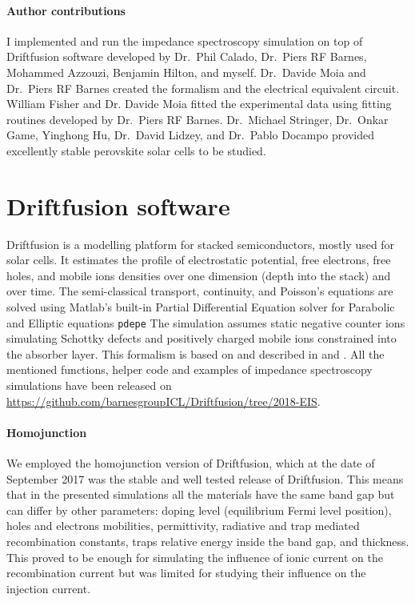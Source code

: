 	\paragraph{Author contributions}
	I implemented and run the impedance spectroscopy simulation on top of Driftfusion software developed by Dr.\ Phil Calado, Dr.\ Piers RF Barnes, Mohammed Azzouzi, Benjamin Hilton, and myself.
	Dr.\ Davide Moia and Dr.\ Piers RF Barnes created the formalism and the electrical equivalent circuit.
	William Fisher and Dr. Davide Moia fitted the experimental data using fitting routines developed by Dr.\ Piers RF Barnes.
	Dr.\ Michael Stringer, Dr.\ Onkar Game, Yinghong Hu, Dr.\ David Lidzey, and Dr.\ Pablo Docampo provided excellently stable perovskite solar cells to be studied.

\section{Driftfusion software}
	Driftfusion is a modelling platform for stacked semiconductors, mostly used for solar cells.
	It estimates the profile of electrostatic potential, free electrons, free holes, and mobile ions densities over one dimension (depth into the stack) and over time.
	The semi-classical transport, continuity, and Poisson's equations are solved using Matlab's built-in Partial Differential Equation solver for Parabolic and Elliptic equations \texttt{pdepe}
	The simulation assumes static negative counter ions simulating Schottky defects \cite{Walsh2015} and positively charged mobile ions constrained into the absorber layer.
	This formalism is based on  and described in  and .
	All the mentioned functions, helper code and examples of impedance spectroscopy simulations have been released on \url{https://github.com/barnesgroupICL/Driftfusion/tree/2018-EIS}.

	\paragraph{Homojunction}
	We employed the homojunction version of Driftfusion, which at the date of September 2017 was the stable and well tested release of Driftfusion.
	This means that in the presented simulations all the materials have the same band gap but can differ by other parameters: doping level (equilibrium Fermi level position), holes and electrons mobilities, permittivity, radiative and trap mediated recombination constants, traps relative energy inside the band gap, and thickness.
	This proved to be enough for simulating the influence of ionic current on the recombination current but was limited for studying their influence on the injection current.


